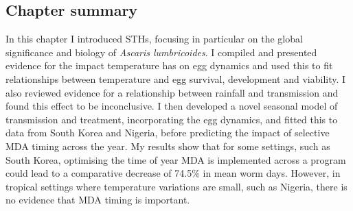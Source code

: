 \subsection{Chapter summary}

In this chapter I introduced STHs, focusing in particular on the global significance and biology of \textit{Ascaris lumbricoides}. I compiled and presented evidence for the impact temperature has on egg dynamics and used this to fit relationships between temperature and egg survival, development and viability. I also reviewed evidence for a relationship between rainfall and transmission and found this effect to be inconclusive. I then developed a novel seasonal model of transmission and treatment, incorporating the egg dynamics, and fitted this to data from South Korea and Nigeria, before predicting the impact of selective MDA timing across the year. My results show that for some settings, such as South Korea, optimising the time of year MDA is implemented across a program could lead to a comparative decrease of 74.5\% in mean worm days. However, in tropical settings where temperature variations are small, such as Nigeria, there is no evidence that MDA timing is important.